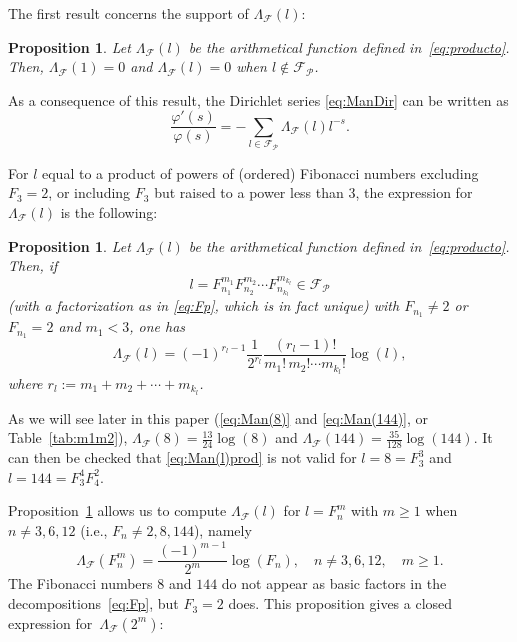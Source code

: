 \documentclass[11pt, a4paper]{article}
\newcommand{\manF}{\Lambda_{\mathcal{F}}}
\newcommand{\Fp}{\mathcal{F}_{\mathcal{P}}}
\theoremstyle{plain}
\newtheorem{proposition}[theorem]{Proposition}
\theoremstyle{definition}
\begin{document}
The first result concerns the support of $\manF(l)$:

\begin{proposition}
\label{prop:Man(l)=0}
Let $\manF(l)$ be the arithmetical function defined in~\eqref{eq:producto}. Then, $\manF(1)=0$ and $\manF(l) = 0$ when $l \notin \Fp$.
\end{proposition}

As a consequence of this result, the Dirichlet series \eqref{eq:ManDir} can be written as
\begin{equation}
\label{eq:ManFp}
\frac{\varphi'(s)}{\varphi(s)}
= -\sum_{l\in \Fp} \manF(l)l^{-s}.
\end{equation}

For $l$ equal to a product of powers of (ordered) Fibonacci numbers excluding $F_3=2$, or including $F_3$ but raised to a power less than $3$, the expression for $\manF(l)$ is the following:

\begin{proposition}
\label{prop:Man(l)prod}
Let $\manF(l)$ be the arithmetical function defined in~\eqref{eq:producto}. 
Then, if 
\[
l = F_{n_1}^{m_1} F_{n_2}^{m_2} \cdots F_{n_{k_l}}^{m_{k_l}} \in \Fp
\] 
(with a factorization as in \eqref{eq:Fp}, which is in fact unique) 
with $F_{n_1}\neq 2$ or $F_{n_1}=2$ and $m_1<3$, one has 
\begin{equation}
\label{eq:Man(l)prod}
\manF(l) =
(-1)^{r_l-1}\frac{1}{2^{r_{l}}}\frac{(r_l-1)!}{m_1!\, m_2! \cdots m_{k_l}!}\log(l), 
\end{equation}
where $r_{l} := m_1 + m_2 + \cdots + m_{k_l}$.
\end{proposition}

As we will see later in this paper (\eqref{eq:Man(8)} and \eqref{eq:Man(144)}, or Table~\ref{tab:m1m2}), 
$\manF(8) = \frac{13}{24}\log(8)$ and $\manF(144) = \frac{35}{128}\log(144)$. 
It can then be checked that \eqref{eq:Man(l)prod} is not valid for $l=8=F_3^3$ 
and $l = 144 = F_3^4 F_4^2$.

Proposition~\ref{prop:Man(l)prod} allows us to compute $\manF(l)$ for $l=F_{n}^m$ with $m \ge 1$ when $n \ne 3,6,12$ (i.e., $F_{n}\ne 2, 8, 144$), namely 
\[
\manF(F_{n}^m) = \frac{(-1)^{m-1}}{2^m} \log(F_{n}), \quad n \ne 3,6,12, \quad m \ge 1.
\]
The Fibonacci numbers $8$ and $144$ do not appear as basic factors in the decompositions~\eqref{eq:Fp}, but $F_3 = 2$ does. 
This proposition gives a closed expression for~$\manF(2^m)$:
\end{document}
